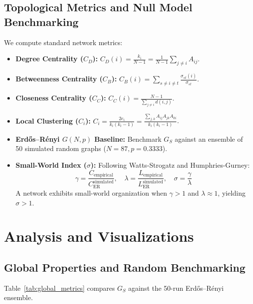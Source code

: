 \documentclass[10pt,twocolumn,a4paper]{article}
\begin{document}
\subsection{Topological Metrics and Null Model Benchmarking}
We compute standard network metrics:
\begin{itemize}[noitemsep,topsep=1pt,leftmargin=1.2em]
    \item \textbf{Degree Centrality ($C_D$):} $C_D(i) = \frac{k_i}{N - 1} = \frac{1}{N - 1}\sum_{j \ne i} A_{ij}$.
    \item \textbf{Betweenness Centrality ($C_B$):} $C_B(i) = \sum_{s \ne i \ne t} \frac{\sigma_{st}(i)}{\sigma_{st}}$.
    \item \textbf{Closeness Centrality ($C_C$):} $C_C(i) = \frac{N - 1}{\sum_{j \ne i} d(i, j)}$.
    \item \textbf{Local Clustering ($C_i$):} $C_i = \frac{2 e_i}{k_i(k_i - 1)} = \frac{\sum_{j, k} A_{ij} A_{jk} A_{ki}}{k_i(k_i - 1)}$.
    \item \textbf{Erd\H{o}s--R\'enyi $G(N, p)$ Baseline:} Benchmark $G_S$ against an ensemble of 50 simulated random graphs ($N = 87, p = 0.3333$).
    \item \textbf{Small-World Index ($\sigma$):} Following Watts-Strogatz and Humphries-Gurney:
    \begin{equation}
    \label{eq:small_world}
    \gamma = \frac{C_{\text{empirical}}}{C_{\text{ER}}^{\text{simulated}}}, \quad \lambda = \frac{L_{\text{empirical}}}{L_{\text{ER}}^{\text{simulated}}}, \quad \sigma = \frac{\gamma}{\lambda}
    \end{equation}
    A network exhibits small-world organization when $\gamma > 1$ and $\lambda \approx 1$, yielding $\sigma > 1$.
\end{itemize}

\section{Analysis and Visualizations}
\label{sec:analysis}

\subsection{Global Properties and Random Benchmarking}
Table~\ref{tab:global_metrics} compares $G_S$ against the 50-run Erd\H{o}s--R\'enyi ensemble.
\end{document}

